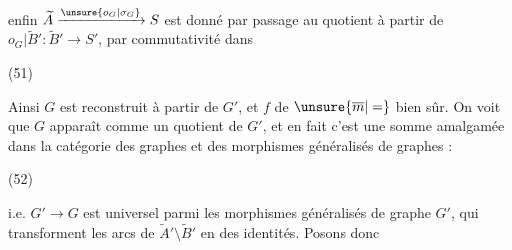 enfin $\widetilde A\xrightarrow{\unsure{o_G|\sigma_G}}S$ est donné par passage au quotient à partir de $o_G|\widetilde B':\widetilde B'\to S'$, par commutativité dans

(51)\quad{}

Ainsi $G$ est reconstruit à partir de $G'$, et $f$ de $\unsure{\overline m|=}$ bien sûr. On voit que $G$ apparaît comme un quotient de $G'$, et en fait c'est  une somme amalgamée dans la catégorie des graphes et des morphismes généralisés de graphes :

(52)\quad{}

i.e. $G'\longrightarrow G$ est universel parmi les morphismes généralisés de  graphe $G'$, qui transforment les arcs de $\widetilde A'\setminus\widetilde B'$ en des identités. Posons donc
